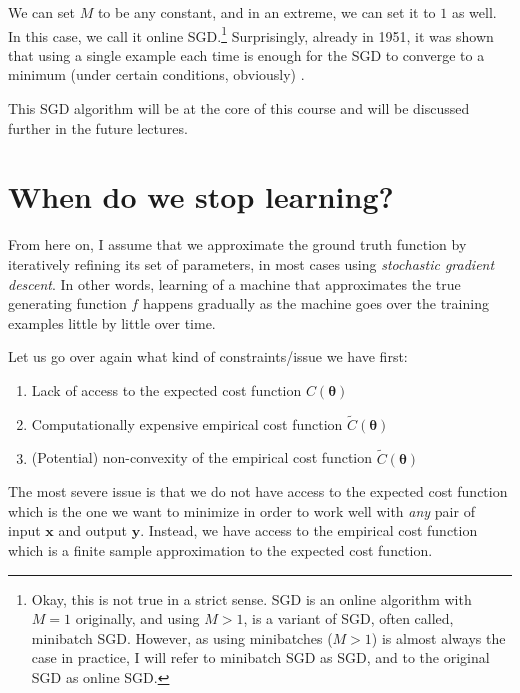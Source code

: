 \documentclass{report}
\newcommand{\vect}[1]{\mathbf{#1}}
\newcommand{\vects}[1]{\boldsymbol{#1}}
\newcommand{\vx}[0]{\vect{x}}
\newcommand{\vy}[0]{\vect{y}}
\newcommand{\TT}[0]{\vects{\theta}}
\begin{document}
We can set $M$ to be any constant, and in an extreme, we can set it to $1$ as
well. In this case, we call it online SGD.\footnote{
    Okay, this is not true in a strict sense. SGD is an online algorithm with
    $M=1$ originally, and using $M>1$, is a variant of SGD, often called,
    minibatch SGD. However, as using minibatches ($M>1$) is almost always the
    case in practice, I will refer to minibatch SGD as SGD, and to the original
    SGD as online SGD.
} Surprisingly, already in 1951, it was shown that using a single example each
time is enough for the SGD to converge to a minimum (under certain conditions,
obviously) \citep{Robbins1951}.

This SGD algorithm will be at the core of this course and will be discussed
further in the future lectures.


\section{When do we stop learning?}
\label{sec:model_selection}

From here on, I assume that we approximate the ground truth function by
iteratively refining its set of parameters, in most cases using {\em stochastic
gradient descent}. In other words, learning of a machine that approximates the
true generating function $f$ happens gradually as the machine goes over the
training examples little by little over time.

Let us go over again what kind of constraints/issue we have first:
\begin{enumerate}
    \item Lack of access to the expected cost function $C(\TT)$
    \item Computationally expensive empirical cost function $\tilde{C}(\TT)$
    \item (Potential) non-convexity of the empirical cost function
        $\tilde{C}(\TT)$
\end{enumerate}

The most severe issue is that we do not have access to the expected cost
function which is the one we want to minimize in order to work well with {\em
any} pair of input $\vx$ and output $\vy$. Instead, we have access to the
empirical cost function which is a finite sample approximation to the expected
cost function. 
\end{document}
